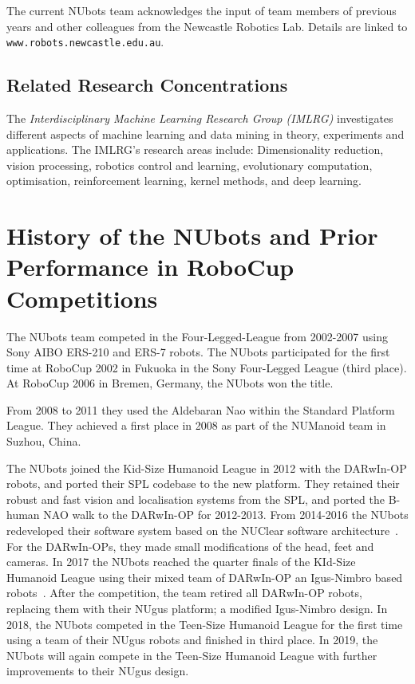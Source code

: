 \documentclass{llncs}
\begin{document}
The current NUbots team acknowledges the input of team members of previous years and other colleagues from the Newcastle Robotics Lab. Details are linked to  \texttt{www.robots.newcastle.edu.au}.

\subsection{Related Research Concentrations}
The \emph{Interdisciplinary Machine Learning Research Group (IMLRG)} investigates different aspects of machine learning and data mining in theory, experiments and applications. The IMLRG's research areas include: Dimensionality reduction, vision processing, robotics control and learning,  evolutionary computation, optimisation, reinforcement learning, kernel methods, and deep learning. 

\section{History of the NUbots and Prior Performance in RoboCup Competitions \cite{AmosEtAl2018}}
The NUbots team competed in the Four-Legged-League from 2002-2007 using Sony AIBO ERS-210 and ERS-7 robots. The NUbots participated for the first time at RoboCup 2002 in Fukuoka in the Sony Four-Legged League (third place). At RoboCup 2006 in Bremen, Germany, the NUbots won the title.

From 2008 to 2011 they used the Aldebaran Nao within the Standard Platform League. They achieved a first place in 2008 as part of the NUManoid team in Suzhou, China.

The NUbots joined the Kid-Size Humanoid League in 2012 with the DARwIn-OP robots, and ported their SPL codebase to the new platform. They retained their robust and fast vision and localisation systems from the SPL, and ported the B-human NAO walk to the DARwIn-OP for 2012-2013. From 2014-2016 the NUbots redeveloped their software system based on the NUClear software architecture~\cite{HoulistonEtAl2015}. For the DARwIn-OPs, they made small modifications of the head, feet and cameras. In 2017 the NUbots reached the quarter finals of the KId-Size Humanoid League using their mixed team of DARwIn-OP an Igus-Nimbro based robots~\cite{allgeuer2016igus}. After the competition, the team retired all DARwIn-OP robots, replacing them with their NUgus platform; a modified Igus-Nimbro design. In 2018, the NUbots competed in the Teen-Size Humanoid League for the first time using a team of their NUgus robots and finished in third place. In 2019, the NUbots will again compete in the Teen-Size Humanoid League with further improvements to their NUgus design.
\end{document}
